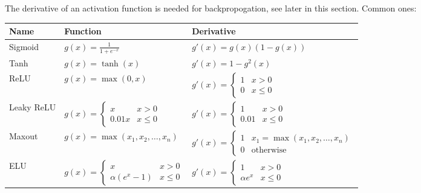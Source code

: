 \documentclass[
../EiKI_Summary.tex,
]
{subfiles}
\begin{document}
\begin{defbox}
    The derivative of an activation function is needed for backpropogation, see later in this section. Common ones:

    \begin{center}
        \begin{tabular}{|p{}|p{}|p{}|}
            \hline
            \textbf{Name} & \textbf{Function} & \textbf{Derivative} \\
            \hline\hline
            Sigmoid & $g(x) = \frac{1}{1 + e^{-x}}$ & $g\prime(x) = g(x)(1 - g(x))$ \\
            \hline
            Tanh & $g(x) = \tanh(x)$ & $g\prime(x) = 1 - g^2(x)$ \\
            \hline
            ReLU & $g(x) = \max(0,x)$ & $g\prime(x) = \begin{cases} 1 & x > 0 \\ 0 & x \leq 0 \end{cases}$ \\
            \hline
            Leaky ReLU & $g(x) = \begin{cases} x & x > 0 \\ 0.01x & x \leq 0 \end{cases}$ & $g\prime(x) = \begin{cases} 1 & x > 0 \\ 0.01 & x \leq 0 \end{cases}$ \\
            \hline
            Maxout & $g(x) = \max(x_1, x_2, \ldots, x_n)$ & $g\prime(x) = \begin{cases} 1 & x_1 = \max(x_1, x_2, \ldots, x_n) \\ 0 & \text{otherwise} \end{cases}$ \\
            \hline
            ELU & $g(x) = \begin{cases} x & x > 0 \\ \alpha(e^x - 1) & x \leq 0 \end{cases}$ & $g\prime(x) = \begin{cases} 1 & x > 0 \\ \alpha e^x & x \leq 0 \end{cases}$ \\
            \hline
        \end{tabular}
    \end{center}
\end{defbox}
\end{document}
